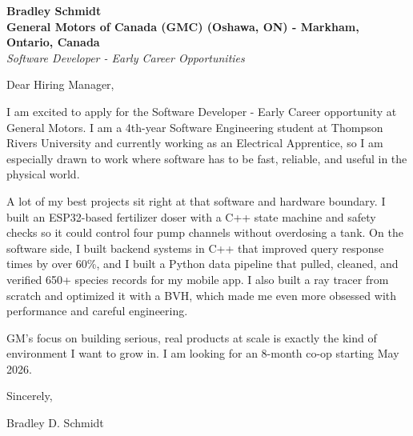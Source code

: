 \documentclass[11pt]{article}
\begin{document}
\textbf{Bradley Schmidt}\\
\vspace{0.5em}
\textbf{General Motors of Canada (GMC) (Oshawa, ON) - Markham, Ontario, Canada}\\
\textit{Software Developer - Early Career Opportunities}

Dear Hiring Manager,

\par

I am excited to apply for the Software Developer - Early Career opportunity at General Motors. I am a 4th-year Software Engineering student at Thompson Rivers University and currently working as an Electrical Apprentice, so I am especially drawn to work where software has to be fast, reliable, and useful in the physical world.

\par

A lot of my best projects sit right at that software and hardware boundary. I built an ESP32-based fertilizer doser with a C++ state machine and safety checks so it could control four pump channels without overdosing a tank. On the software side, I built backend systems in C++ that improved query response times by over 60\%, and I built a Python data pipeline that pulled, cleaned, and verified 650+ species records for my mobile app. I also built a ray tracer from scratch and optimized it with a BVH, which made me even more obsessed with performance and careful engineering.

\par

GM’s focus on building serious, real products at scale is exactly the kind of environment I want to grow in. I am looking for an 8-month co-op starting May 2026.

\par

Sincerely,

\par

Bradley D. Schmidt
\end{document}
